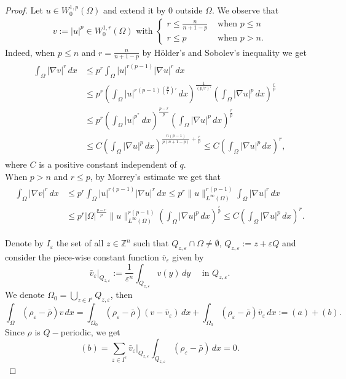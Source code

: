\documentclass[12pt]{amsart}
\theoremstyle{definition}
\theoremstyle{remark}
\numberwithin{equation}{section}
\begin{document}
 
\begin{proof}
Let $u\in W^{1,p}_0(\Omega)$ and extend it by 0 outside $\Omega$. We observe that 
\begin{align*}
v:=|u|^p\in W^{1,r}_0(\Omega) \text{ with }
\begin{cases}
r\leq \frac{n}{n+1-p} &\text{ when } p\leq n\\
r\leq p &\text{ when } p>n.
\end{cases}
\end{align*}
Indeed, when $p\leq n$ and  $r= \frac{n}{n+1-p}$ by H\"older's and Sobolev's inequality we get
\begin{align} \label{cota1}
\begin{split}
\int_\Omega |\nabla v|^r\,dx &\leq p^r \int_\Omega |u|^{r(p-1)} |\nabla u|^r\,dx\\
&\leq p^r \left(\int_\Omega |u|^{r(p-1)(\frac{p}{r})' }\,dx \right)^{\frac{1}{(p/r)'}} \left(\int_\Omega |\nabla u|^p\,dx \right)^\frac{r}{p}\\
&\leq p^r \left(\int_\Omega |u|^{p^*}\,dx  \right)^\frac{p-r}{p}    \left(\int_\Omega |\nabla u|^p\,dx \right)^\frac{r}{p}\\
&\leq C \left(\int_\Omega  |\nabla u|^p \,dx \right)^{\frac{n(p-1)}{p(n+1-p)}+\frac{r}{p}}\leq C \left(\int_\Omega  |\nabla u|^p \,dx \right)^r,
\end{split}
\end{align}
where $C$ is a positive constant independent of $q$.
\\
When $p>n$ and $r\leq p$, by Morrey's estimate we get that
\begin{align} \label{cota2}
\begin{split}
\int_\Omega |\nabla v|^r\,dx &\leq p^r \int_\Omega |u|^{r(p-1)} |\nabla u|^r\,dx \leq p^r \|u\|_{L^\infty(\Omega)}^{r(p-1)} \int_\Omega |\nabla u|^r\,dx\\
&\leq p^r |\Omega|^\frac{p-r}{p} \|u\|_{L^\infty(\Omega)}^{r(p-1)} \left(\int_\Omega |\nabla u|^p\,dx\right)^\frac{r}{p}\leq C \left(\int_\Omega |\nabla u|^p\,dx\right)^{r}.
\end{split}
\end{align}

Denote by $I_\varepsilon$ the set of all $z\in \mathbb{Z}^n$ such that $Q_{z,\varepsilon}\cap \Omega\neq \emptyset$, $Q_{z,\varepsilon}:= z+\varepsilon Q$ and consider the piece-wise constant function $\bar v_\varepsilon$ given by
$$
\bar v_\varepsilon\big|_{Q_{z,\varepsilon}} :=\frac{1}{\varepsilon^n}\int_{Q_{z,\varepsilon}} v(y)\,dy \quad \text{ in }Q_{z,\varepsilon}.
$$
We denote $\displaystyle\Omega_0=\bigcup_{z\in I^\varepsilon} Q_{z,\varepsilon}$, then
$$
\int_\Omega (\rho_\varepsilon-\bar \rho) v\,dx= \int_{\Omega_0} (\rho_\varepsilon-\bar \rho) (v-\bar v_\varepsilon)\,dx  +  \int_{\Omega_0} (\rho_\varepsilon-\bar \rho)   \bar v_\varepsilon  \,dx:=(a)+(b). 
$$
Since $\rho$ is $Q-$periodic, we get
\begin{equation} \label{cotav0}
(b)=\sum_{z\in I^\varepsilon } \bar v_\varepsilon \big|_{Q_{z,\varepsilon}} \int_{Q_{z,\varepsilon}} (\rho_\varepsilon -\bar \rho)\,dx=0.
\end{equation}


\end{proof}
\end{document}
